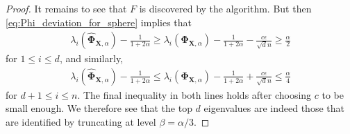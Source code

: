 \documentclass[final,12pt]{colt2018} %
\numberwithin{equation}{section}
\newcommand{\boldPhi}{\boldsymbol{\Phi}}
\newcommand{\boldX}{\textbf{X}}
\begin{document}
\begin{proof}
	It remains to see that $F$ is discovered by the algorithm. But then \eqref{eq:Phi_deviation_for_sphere} implies that
	\begin{align*}
	\lambda_i(\hat{\boldPhi}_{\boldX,\alpha}) - \frac{1}{1+2\alpha} \geq \lambda_i(\boldPhi_{\boldX,\alpha}) - \frac{1}{1+2\alpha} - \frac{c\epsilon}{\sqrt{d}n} \geq \frac{\alpha}{2}
	\end{align*}
	for $1 \leq i \leq d$, and similarly,
	\begin{align*}
	\lambda_i(\hat{\boldPhi}_{\boldX,\alpha}) - \frac{1}{1+2\alpha} \leq \lambda_i(\boldPhi_{\boldX,\alpha}) - \frac{1}{1+2\alpha} + \frac{c\epsilon}{\sqrt{d}n} \leq \frac{\alpha}{4}
	\end{align*}
	for $d+1 \leq i \leq n$. The final inequality in both lines holds after choosing $c$ to be small enough. We therefore see that the top $d$ eigenvalues are indeed those that are identified by truncating at level $\beta = \alpha/3$.
\end{proof}
\end{document}
